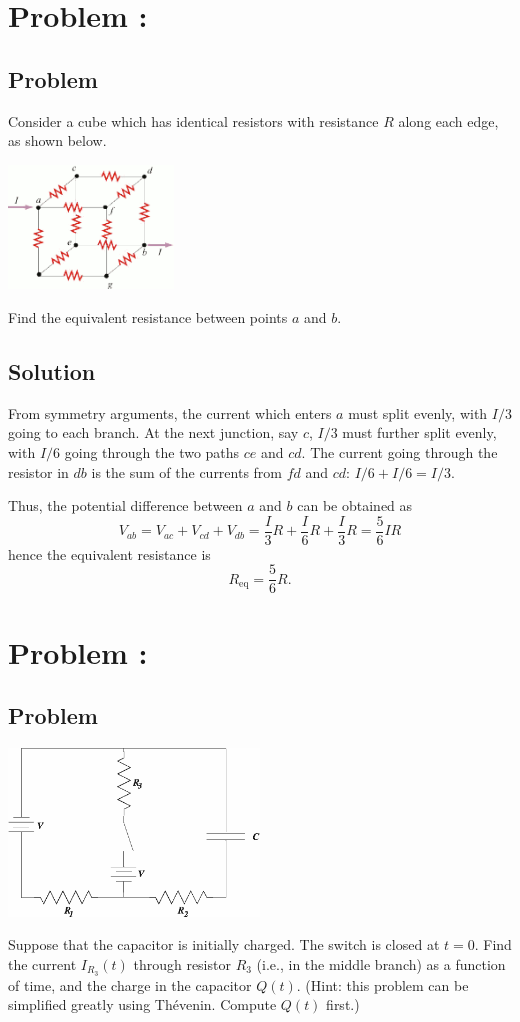 \documentclass[solutions]{esg8022pset}
\begin{document}
\section{Problem \thesection: }
\subsection{Problem}
  Consider a cube which has identical resistors with resistance $R$ along each edge, as shown below.
  \begin{center}\includegraphics[width=0.33\textwidth]{ps07_06}\end{center}
  Find the equivalent resistance between points $a$ and $b$.
\subsection{Solution}
  From symmetry arguments, the current which enters $a$ must split evenly, with $I / 3$ going to each branch.  At the next junction, say $c$, $I / 3$ must further split evenly, with $I / 6$ going through the two paths $ce$ and $cd$.  The current going through the resistor in $db$ is the sum of the currents from $fd$ and $cd$: $I / 6 + I / 6 = I / 3$.

  Thus, the potential difference between $a$ and $b$ can be obtained as
  $$V_{ab} = V_{ac} + V_{cd} + V_{db} = \frac{I}{3}R + \frac{I}{6}R + \frac{I}{3}R = \frac56 IR$$
  hence the equivalent resistance is
  $$R_{\text{eq}} = \frac56 R.$$
\section{Problem \thesection: }
\subsection{Problem}
  \begin{center}\includegraphics[width=0.5\textwidth]{ps07_07}\end{center}
  Suppose that the capacitor is initially charged.  The switch is closed at $t = 0$.  Find the current $I_{R_3}(t)$ through resistor $R_3$ (i.e., in the middle branch) as a function of time, and the charge in the capacitor $Q(t)$.  (Hint: this problem can be simplified greatly using Th\'evenin.  Compute $Q(t)$ first.)
\end{document}
